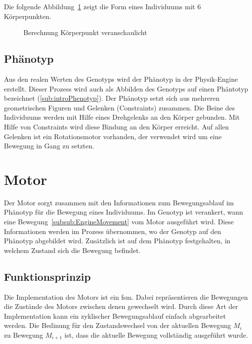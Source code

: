        \smallskip

        Die folgende Abbildung~\ref{fig:kp} zeigt die Form eines Individuums mit 6 Körperpunkten.

        \begin{figure}[H]
          \centering
          
          \caption{Berechnung Körperpunkt veranschaulicht\label{fig:kp}}
        \end{figure}

    \subsection{Phänotyp\label{sub:Phenotyp}}

      Aus den realen Werten des Genotyps wird der Phänotyp in der Physik-Engine erstellt.
      Dieser Prozess wird auch als Abbilden des Genotyps auf einen Phäntotyp bezeichnet (\vref{sub:introPhenotyp}).
      Der Phänotyp setzt sich aus mehreren geometrischen Figuren und Gelenken (\Glspl{Constraint}) zusammen.
      Die Beine des Individuums werden mit Hilfe eines Drehgelenks an den Körper gebunden.
      Mit Hilfe von Constraints wird diese Bindung an den Körper erreicht.
      Auf allen Gelenken ist ein Rotationsmotor vorhanden, der verwendet wird um eine Bewegung in Gang zu setzten.

  \section{Motor\label{sec:Engine}}

    Der Motor sorgt zusammen mit den Informationen zum Bewegungsablauf im Phänotyp für die Bewegung eines Individuums.
    Im Genotyp ist verankert, wann eine Bewegung~\vref{subsub:EngineMovement} vom Motor ausgeführt wird.
    Diese Informationen werden im Prozess übernommen, wo der Genotyp auf den Phänotyp abgebildet wird.
    Zusätzlich ist auf dem Phänotyp festgehalten, in welchem Zustand sich die Bewegung befindet.

    \subsection{Funktionsprinzip}

      Die Implementation des Motors ist ein \acrfull{fsm}.
      Dabei repräsentieren die Bewegungen die Zustände des Motors zwischen denen gewechselt wird.
      Durch diese Art der Implementation kann ein zyklischer Bewegungsablauf einfach abgearbeitet werden.
      Die Bedinung für den Zustandswechsel von der aktuellen Bewegung \( M_{i} \) zu Bewegung \( M_{i + 1} \) ist,
      dass die aktuelle Bewegung vollständig ausgeführt wurde.

